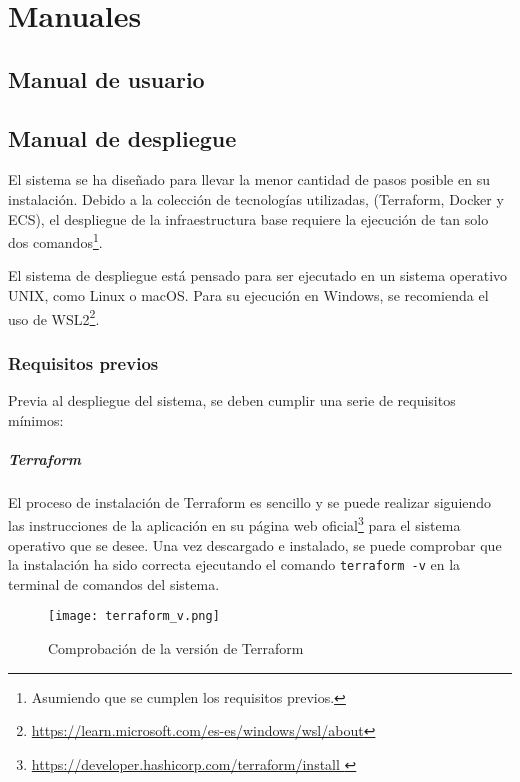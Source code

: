 \chapter{Manuales}\label{chap:manual}

\section{Manual de usuario}\label{sec:manual_usuario}


\newpage{}
\section{Manual de despliegue}\label{sec:manual_despliegue}
El sistema se ha diseñado para llevar la menor cantidad de pasos posible en su
instalación. Debido a la colección de tecnologías utilizadas, (Terraform,
Docker y ECS), el despliegue de la infraestructura base requiere la ejecución de
tan solo dos comandos\footnote{Asumiendo que se cumplen los requisitos previos.}.

El sistema de despliegue está pensado para ser ejecutado en un sistema operativo
UNIX, como Linux o macOS. Para su ejecución en Windows, se recomienda el uso
de WSL2\footnote{\url{https://learn.microsoft.com/es-es/windows/wsl/about}}.


\subsection{Requisitos previos}
Previa al despliegue del sistema, se deben cumplir una serie de requisitos
mínimos:


\paragraph{Terraform}
El proceso de instalación de Terraform es sencillo y se puede realizar siguiendo
las instrucciones de la aplicación en su página web oficial\footnote{\url{
	https://developer.hashicorp.com/terraform/install
}} para el sistema operativo que se desee. Una vez descargado e instalado,
se puede comprobar que la instalación ha sido correcta ejecutando el comando
\texttt{terraform -v} en la terminal de comandos del sistema.

\begin{figure}[H]
	\centering
	\texttt{[image: terraform\_v.png]}
	\caption{Comprobación de la versión de Terraform}
	\label{fig:terraform_version}
\end{figure}


